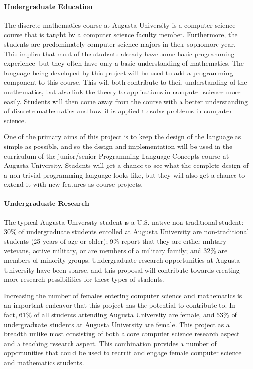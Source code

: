 \paragraph{Undergraduate Education}  The discrete mathematics course at Augusta
University is a computer science course that is taught by a computer
science faculty member.  Furthermore, the students are predominately
computer science majors in their sophomore year.  This implies that
most of the students already have some basic programming experience,
but they often have only a basic understanding of mathematics.  The
language being developed by this project will be used to add a
programming component to this course.  This will both contribute to
their understanding of the mathematics, but also link the theory to
applications in computer science more easily.  Students will then come
away from the course with a better understanding of discrete
mathematics and how it is applied to solve problems in computer
science.

One of the primary aims of this project is to keep the design of the
language as simple as possible, and so the design and implementation
will be used in the curriculum of the junior/senior Programming
Language Concepts course at Augusta University.  Students will get a
chance to see what the complete design of a non-trivial programming
language looks like, but they will also get a chance to extend it with
new features as course projects.

\paragraph{Undergraduate Research}  The typical Augusta University
student is a U.S. native non-traditional student: 30\% of
undergraduate students enrolled at Augusta University are
non-traditional students (25 years of age or older); 9\% report that
they are either military veterans, active military, or are members of
a military family; and 32\% are members of minority groups.
Undergraduate research opportunities at Augusta University have been
sparse, and this proposal will contribute towards creating more
research possibilities for these types of students.


Increasing the number of females entering computer science and
mathematics is an important endeavor that this project has the
potential to contribute to.  In fact, 61\% of all students attending
Augusta University are female, and 63\% of undergraduate students at
Augusta University are female.  This project as a breadth unlike most
consisting of both a core computer science research aspect and a
teaching research aspect.  This combination provides a number of
opportunities that could be used to recruit and engage female computer
science and mathematics students.

